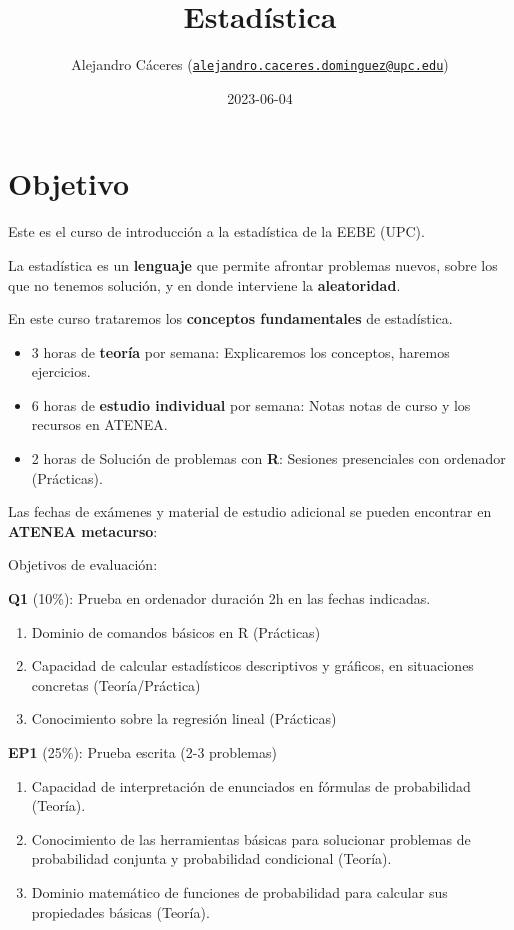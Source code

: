 \documentclass[
]{book}
\title{Estadística}
\author{Alejandro Cáceres (\href{mailto:alejandro.caceres.dominguez@upc.edu}{\nolinkurl{alejandro.caceres.dominguez@upc.edu}})}
\date{2023-06-04}
\providecommand{\tightlist}{%
  \setlength{\itemsep}{0pt}\setlength{\parskip}{0pt}}
\begin{document}
\maketitle

{
\setcounter{tocdepth}{1}
\tableofcontents
}
\hypertarget{objetivo}{%
\chapter{Objetivo}\label{objetivo}}

Este es el curso de introducción a la estadística de la EEBE (UPC).

La estadística es un \textbf{lenguaje} que permite afrontar problemas nuevos, sobre los que no tenemos solución, y en donde interviene la \textbf{aleatoridad}.

En este curso trataremos los \textbf{conceptos fundamentales} de estadística.

\begin{itemize}
\item
  3 horas de \textbf{teoría} por semana: Explicaremos los conceptos, haremos ejercicios.
\item
  6 horas de \textbf{estudio individual} por semana: Notas notas de curso y los recursos en ATENEA.
\item
  2 horas de Solución de problemas con \textbf{R}: Sesiones presenciales con ordenador (Prácticas).
\end{itemize}

Las fechas de exámenes y material de estudio adicional se pueden encontrar en \textbf{ATENEA metacurso}:

Objetivos de evaluación:

\textbf{Q1} (10\%): Prueba en ordenador duración 2h en las fechas indicadas.

\begin{enumerate}
\def\labelenumi{\alph{enumi}.}
\tightlist
\item
  Dominio de comandos básicos en R (Prácticas)
\item
  Capacidad de calcular estadísticos descriptivos y gráficos, en situaciones concretas (Teoría/Práctica)
\item
  Conocimiento sobre la regresión lineal (Prácticas)
\end{enumerate}

\textbf{EP1} (25\%): Prueba escrita (2-3 problemas)

\begin{enumerate}
\def\labelenumi{\alph{enumi}.}
\tightlist
\item
  Capacidad de interpretación de enunciados en fórmulas de probabilidad (Teoría).
\item
  Conocimiento de las herramientas básicas para solucionar problemas de probabilidad conjunta y probabilidad condicional (Teoría).
\item
  Dominio matemático de funciones de probabilidad para calcular sus propiedades básicas (Teoría).
\end{enumerate}
\end{document}
